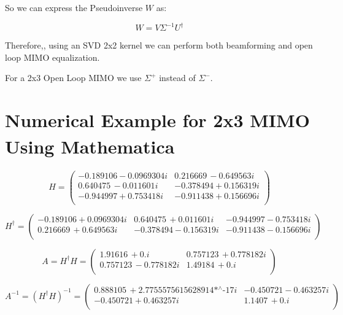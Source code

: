 So we can express the Pseudoinverse $W$ as:

\begin{equation}
W=V\Sigma^{-1}U^{\dagger}
\end{equation}


Therefore,, using an SVD 2x2 kernel we can perform  both beamforming and open loop MIMO equalization.

For a 2x3 Open Loop MIMO we use $\Sigma^{+}$ instead of $\Sigma^{-}$. 

\section{Numerical Example for 2x3 MIMO Using Mathematica\textsuperscript{\textregistered}}

\begin{equation}
H=\left(
\begin{array}{cc}
 -0.189106-0.0969304 i & 0.216669\, -0.649563 i \\
 0.640475\, -0.011601 i & -0.378494+0.156319 i \\
 -0.944997+0.753418 i & -0.911438+0.156696 i \\
\end{array}
\right)
\end{equation}

\begin{equation}
H^{\dagger}=\left(
\begin{array}{ccc}
 -0.189106+0.0969304 i & 0.640475\, +0.011601 i & -0.944997-0.753418 i \\
 0.216669\, +0.649563 i & -0.378494-0.156319 i & -0.911438-0.156696 i \\
\end{array}
\right)
\end{equation}

\begin{equation}
A=H^{\dagger} H =\left(
\begin{array}{cc}
 1.91616\, +0. i & 0.757123\, +0.778182 i \\
 0.757123\, -0.778182 i & 1.49184\, +0. i \\
\end{array}
\right)
\end{equation}

\begin{equation}
A^{-1}=(H^{\dagger} H)^{-1}  =\left(
\begin{array}{cc}
 0.888105\, +\text{2.7755575615628914$\grave{ }$*${}^{\wedge}$-17} i & -0.450721-0.463257 i \\
 -0.450721+0.463257 i & 1.1407\, +0. i \\
\end{array}
\right)
\end{equation}

